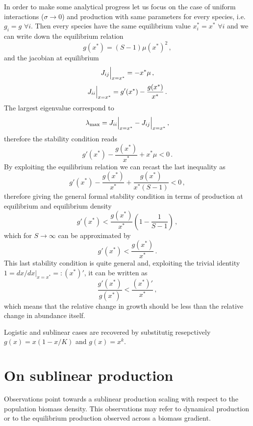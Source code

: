 \documentclass[10pt]{article}
\begin{document}
In order to make some analytical progress let us focus on the case
of uniform interactions ($\sigma\to0$) and production
with same parameters for every species, i.e. $g_i=g$ $\forall i$.
Then every species have the same equilibrium value $x_i^*=x^*$
$\forall i$ and we can write down the equilibrium relation
\begin{equation}
    g(x^*)=(S-1)\mu (x^*)^2 \, ,
\end{equation}
and the jacobian at equilibrium
\begin{equation}
    J_{ij}\Big{|}_{x=x^*} = -x^*\mu \, ,
\end{equation}
\begin{equation}
    J_{ii}\Big{|}_{x=x^*} =  g'(x^*)-\frac{g(x^*)}{x^*}\, .
\end{equation}
The largest eigenvalue correspond to
\begin{equation}
    \lambda_{\max}=J_{ii}\Big{|}_{x=x^*}-J_{ij}\Big{|}_{x=x^*} \, ,
\end{equation}
therefore the stability condition reads
\begin{equation}
    g'(x^*)- \frac{g(x^*)}{x^*} + x^*\mu < 0 \, .
\end{equation}
By exploiting the equilibrium relation we can recast the last
inequality as
\begin{equation}
    g'(x^*)- \frac{g(x^*)}{x^*} + \frac{g(x^*)}{x^*(S-1)} < 0 \, ,
\end{equation}
therefore giving the general formal stability condition in terms
of production at equilibrium and equilibrium density
\begin{equation}
    g'(x^*) < \frac{g(x^*)}{x^*}\left(1 - \frac{1}{S-1}\right) \, ,
\end{equation}
which for $S\to\infty$ can be approximated by 
\begin{equation}
    g'(x^*) < \frac{g(x^*)}{x^*} \, .
\end{equation}
This last stability condition is quite general and, exploiting the trivial identity
$1=dx/dx|_{x=x^*}=:(x^*)'$, it can be written as
\begin{equation}
    \frac{g'(x^*)}{g(x^*)} < \frac{(x^*)'}{x^*}\, ,
\end{equation}
which means that the relative change in growth should be less than the relative
change in abundance itself.

Logistic and sublinear cases are recovered by substitutig resepctively
$g(x)=x(1-x/K)$ and $g(x)=x^k$.

\section{On sublinear production}
\label{sec: On sublinear production}
Observations point towards a sublinear production scaling
with respect to the population biomass density. 
This observations may refer to
dynamical production or to the equilibrium production observed
across a biomass gradient.
\end{document}
